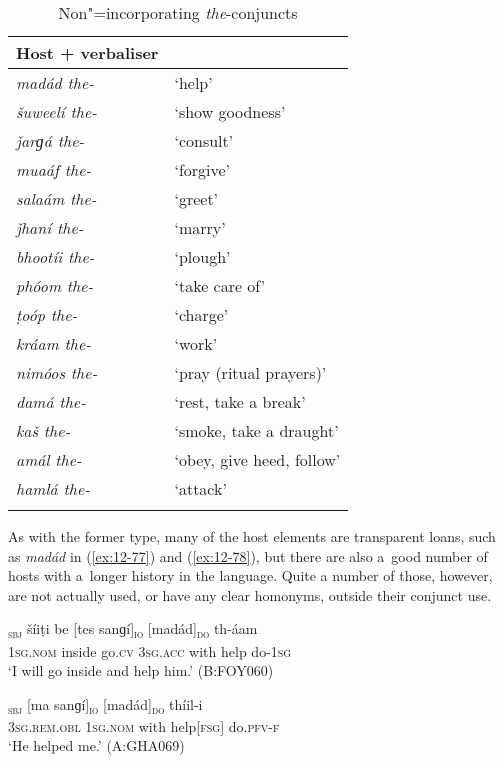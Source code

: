 \begin{table}[ht]
\caption{Non"=incorporating \textit{the}-conjuncts}
\begin{tabularx}{.75\textwidth}{ l@{\hspace{45pt}} Q} 
\lsptoprule
Host + verbaliser &
\\\hline
\textit{madád the-} &
`help'\\
\textit{šuweelí the-} &
`show goodness'\\
\textit{ǰarɡá the-} &
`consult'\\
\textit{muaáf the-} &
`forgive'\\
\textit{salaám the-} &
`greet'\\
\textit{ǰhaní the-} &
`marry'\\
\textit{bhootíi the-} &
`plough'\\
\textit{phóom the-} &
`take care of'\\
\textit{ṭoóp the-} &
`charge'\\
\textit{kráam the-} &
`work'\\
\textit{nimóos the-} &
`pray (ritual prayers)'\\
\textit{damá the-} &
`rest, take a break'\\
\textit{kaš the-} &
`smoke, take a draught'\\
\textit{amál the-} &
`obey, give heed, follow'\\
\textit{hamlá the-} &
`attack'\\\lspbottomrule
\end{tabularx}
\label{tab:12-4}
\end{table}


As with the former type, many of the host elements are transparent loans, such as \textit{madád} in (\ref{ex:12-77}) and (\ref{ex:12-78}), but there are also a~good number of hosts with a~longer history in the language. Quite a number of those, however, are not actually used, or have any clear homonyms, outside their conjunct use.

\begin{exe}
\ex
\label{ex:12-77}
\gll [ma]\textsubscript{\textsc{sbj}} šíiṭi be [tes sanɡí]\textsubscript{\textsc{io}} [madád]\textsubscript{\textsc{do}} th-áam  \\
\textsc{1sg.nom} inside go.\textsc{cv} \textsc{3sg.acc} with help do-\textsc{1sg} \\
\glt `I will go inside and help him.' (B:FOY060)
\end{exe}
\begin{exe}
\ex
\label{ex:12-78}
\gll [eetíi]\textsubscript{\textsc{sbj}} [ma sanɡí]\textsubscript{\textsc{io}} [madád]\textsubscript{\textsc{do}} thíil-i  \\
\textsc{3sg.rem.obl} \textsc{1sg.nom} with help[\textsc{fsg]} do.\textsc{pfv-f}  \\
\glt `He helped me.' (A:GHA069)
\end{exe}

